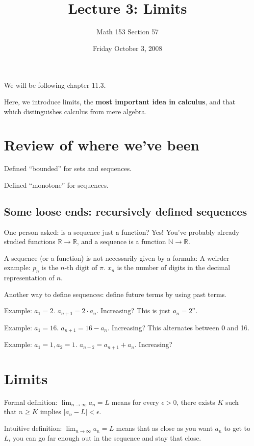 \documentclass[12pt]{article}
\title{Lecture 3: Limits}
\author{Math 153 Section 57}
\date{Friday October  3, 2008}
\newcommand{\N}{\mathbb{N}}
\newcommand{\R}{\mathbb{R}}
\begin{document}
\maketitle

We will be following chapter 11.3.

Here, we introduce limits, the \textbf{most important idea in
  calculus}, and that which distinguishes calculus from mere algebra.

\section{Review of where we've been}

Defined ``bounded'' for sets and sequences.

Defined ``monotone'' for sequences.

\subsection{Some loose ends: recursively defined sequences}

One person asked: is a sequence just a function?  Yes!  You've
probably already studied functions $\R \to \R$, and a sequence is a
function $\N \to \R$.

A sequence (or a function) is not necessarily given by a formula: A
weirder example: $p_n$ is the $n$-th digit of $\pi$.  $x_n$ is the
number of digits in the decimal representation of $n$.

Another way to define sequences: define future terms by using past terms.

Example: $a_1 = 2$.  $a_{n+1} = 2 \cdot a_n$.  Increasing?  This is just $a_n = 2^n$.

Example: $a_1 = 16$.  $a_{n+1} = 16 - a_n$.  Increasing?  This
alternates between 0 and 16.

Example: $a_1 = 1, a_2 = 1$.  $a_{n+2} = a_{n+1} + a_n$.  Increasing?

\section{Limits}

Formal definition: $\lim_{n \to \infty} a_n = L$ means for every $\epsilon >
0$, there exists $K$ such that $n \geq K$ implies $|a_n - L| <
\epsilon$.

Intuitive definition: $\lim_{n \to \infty} a_n = L$ means that as
close as you want $a_n$ to get to $L$, you can go far enough out in
the sequence and stay that close.
\end{document}
